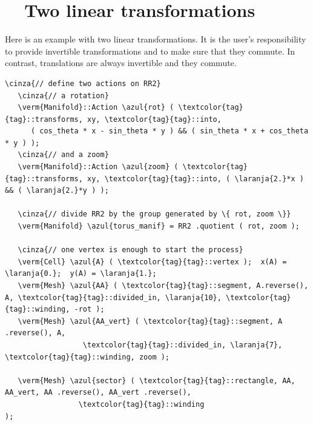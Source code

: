 \section{~~Two linear transformations}\label{\numb section 7.\numb parag 18}

Here is an example with two linear transformations.
It is the user's responsibility to provide invertible transformations and
to make sure that they commute.
In contrast, translations are always invertible and they commute.

\begin{Verbatim}[commandchars=\\\{\},formatcom=\small\tt,frame=single,
   label=parag-\ref{\numb section 7.\numb parag 18}.cpp,rulecolor=\color{moldura},
   baselinestretch=0.94,framesep=2mm                                             ]
   \cinza{// define two actions on RR2}
   \cinza{// a rotation}
   \verm{Manifold}::Action \azul{rot} ( \textcolor{tag}{tag}::transforms, xy, \textcolor{tag}{tag}::into,
      ( cos_theta * x - sin_theta * y ) && ( sin_theta * x + cos_theta * y ) );
   \cinza{// and a zoom}
   \verm{Manifold}::Action \azul{zoom} ( \textcolor{tag}{tag}::transforms, xy, \textcolor{tag}{tag}::into, ( \laranja{2.}*x ) && ( \laranja{2.}*y ) );

   \cinza{// divide RR2 by the group generated by \{ rot, zoom \}}
   \verm{Manifold} \azul{torus_manif} = RR2 .quotient ( rot, zoom );

   \cinza{// one vertex is enough to start the process}
   \verm{Cell} \azul{A} ( \textcolor{tag}{tag}::vertex );  x(A) = \laranja{0.};  y(A) = \laranja{1.};
   \verm{Mesh} \azul{AA} ( \textcolor{tag}{tag}::segment, A.reverse(), A, \textcolor{tag}{tag}::divided_in, \laranja{10}, \textcolor{tag}{tag}::winding, -rot );
   \verm{Mesh} \azul{AA_vert} ( \textcolor{tag}{tag}::segment, A .reverse(), A,
                  \textcolor{tag}{tag}::divided_in, \laranja{7}, \textcolor{tag}{tag}::winding, zoom );

   \verm{Mesh} \azul{sector} ( \textcolor{tag}{tag}::rectangle, AA, AA_vert, AA .reverse(), AA_vert .reverse(),
                 \textcolor{tag}{tag}::winding                                                   );
\end{Verbatim}
  
